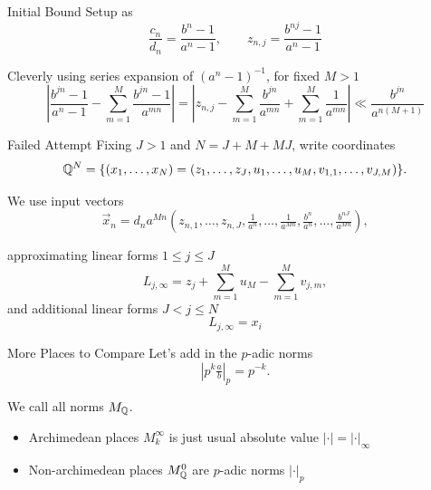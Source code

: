\documentclass{beamer}
\begin{document}
\begin{frame}{Initial Bound}
    Setup as
    \[
        \frac{c_n}{d_n} = \frac{b^n - 1}{a^n - 1},
        \qquad
        z_{n, j} = \frac{b^{nj} - 1}{a^n - 1}
    \]

    Cleverly using series expansion of $(a^n - 1)^{-1}$,
    for fixed $M > 1$
    \[
        \left|
            \frac{b^{jn} - 1}{a^n - 1}
            - \sum_{m = 1}^M \frac{b^{jn} - 1}{a^{mn}}
        \right|
        = \left|
            z_{n,j}
            - \sum_{m = 1}^M \frac{b^{jn}}{a^{mn}}
            + \sum_{m = 1}^M \frac{1}{a^{m n}}
        \right|
        \ll \frac{b^{jn}}{a^{n(M + 1)}}
    \]
\end{frame}

\begin{frame}{Failed Attempt}
    Fixing $J > 1$ and $N = J + M + MJ$,
    write coordinates
    \[
        \mathbb{Q}^N = \{
            (x_1, \ldots, x_N) = (
                z_1, \ldots, z_J, 
                u_1, \ldots, u_M,
                v_{1,1}, \ldots, v_{J,M}
            )\}.
    \]

    We use input vectors
    \[
        \vec{x}_n = d_n a^{Mn} (
            z_{n,1}, \ldots, z_{n,J},
            \tfrac{1}{a^n}, \ldots, \tfrac{1}{a^{Mn}},
            \tfrac{b^n}{a^n}, \ldots, \tfrac{b^{nJ}}{a^{Mn}}
        ),
    \]

    approximating linear forms $1 \leq j \leq J$
    \[
        L_{j, \infty}
        = z_j 
            + \sum_{m = 1}^M u_M
            - \sum_{m = 1}^M v_{j,m},
    \]
    and additional linear forms $J < j \leq N$
    \[
        L_{j, \infty} = x_i
    \]
\end{frame}

\begin{frame}{More Places to Compare}
    Let's add in the $p$-adic norms
    \[
        |p^k \tfrac{a}{b}|_p = p^{-k}.
    \]

    We call all norms $M_{\mathbb{Q}}$.

    \begin{itemize}
        \item Archimedean places $M_k^\infty$ is just usual absolute value $| \cdot | = |\cdot|_\infty$
        \item Non-archimedean places $M_{\mathbb{Q}}^0$ are $p$-adic norms $| \cdot |_p$
    \end{itemize}
\end{frame}
\end{document}
